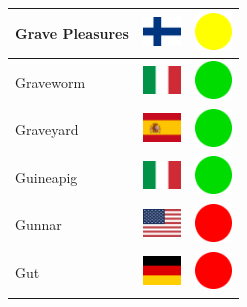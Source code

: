 \documentclass[12pt, a4paper, twoside]{report}
\begin{document}
\begin{center}
\begin{longtable}{|p{5cm}|p{2cm}|p{2cm}|}
Grave Pleasures & \includegraphics[width=1cm]{4x3/fi} & \includegraphics[width=1cm]{likes/m} \\ \hline
Graveworm & \includegraphics[width=1cm]{4x3/it} & \includegraphics[width=1cm]{likes/y} \\ \hline
Graveyard & \includegraphics[width=1cm]{4x3/es} & \includegraphics[width=1cm]{likes/y} \\ \hline
Guineapig & \includegraphics[width=1cm]{4x3/it} & \includegraphics[width=1cm]{likes/y} \\ \hline
Gunnar & \includegraphics[width=1cm]{4x3/us} & \includegraphics[width=1cm]{likes/n} \\ \hline
Gut & \includegraphics[width=1cm]{4x3/de} & \includegraphics[width=1cm]{likes/n} \\ \hline

\end{longtable}
\end{center}
\end{document}
